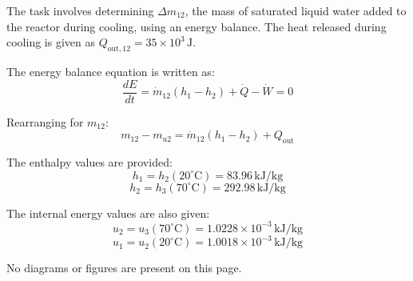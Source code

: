 The task involves determining \( \Delta m_{12} \), the mass of saturated liquid water added to the reactor during cooling, using an energy balance. The heat released during cooling is given as \( Q_{\text{out},12} = 35 \times 10^3 \, \text{J} \).

The energy balance equation is written as:  
\[
\frac{dE}{dt} = \dot{m}_{12} (h_1 - h_2) + \dot{Q} - \dot{W} = 0
\]

Rearranging for \( m_{12} \):  
\[
m_{12} - m_{u2} = \dot{m}_{12} (h_1 - h_2) + Q_{\text{out}}
\]

The enthalpy values are provided:  
\[
h_1 = h_2(20^\circ\text{C}) = 83.96 \, \text{kJ/kg}
\]
\[
h_2 = h_3(70^\circ\text{C}) = 292.98 \, \text{kJ/kg}
\]

The internal energy values are also given:  
\[
u_2 = u_3(70^\circ\text{C}) = 1.0228 \times 10^{-3} \, \text{kJ/kg}
\]
\[
u_1 = u_2(20^\circ\text{C}) = 1.0018 \times 10^{-3} \, \text{kJ/kg}
\]  

No diagrams or figures are present on this page.